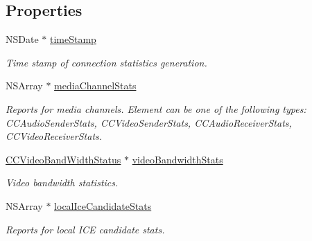 \subsection*{Properties}
\begin{DoxyCompactItemize}
\item 
\mbox{\label{interface_c_c_connection_status_a153b11c8fbc987bd7570385c652e05e7}} 
N\+S\+Date $\ast$ \hyperlink{interface_c_c_connection_status_a153b11c8fbc987bd7570385c652e05e7}{time\+Stamp}
\begin{DoxyCompactList}\small\item\em Time stamp of connection statistics generation. \end{DoxyCompactList}\item 
\mbox{\label{interface_c_c_connection_status_ab58630d72ae1c93f02bf2467a993ef2b}} 
N\+S\+Array $\ast$ \hyperlink{interface_c_c_connection_status_ab58630d72ae1c93f02bf2467a993ef2b}{media\+Channel\+Stats}
\begin{DoxyCompactList}\small\item\em Reports for media channels. Element can be one of the following types\+: C\+C\+Audio\+Sender\+Stats, C\+C\+Video\+Sender\+Stats, C\+C\+Audio\+Receiver\+Stats, C\+C\+Video\+Receiver\+Stats. \end{DoxyCompactList}\item 
\mbox{\label{interface_c_c_connection_status_a2ec3945f91253d49cc5c59561f70ec72}} 
\hyperlink{interface_c_c_video_band_width_status}{C\+C\+Video\+Band\+Width\+Status} $\ast$ \hyperlink{interface_c_c_connection_status_a2ec3945f91253d49cc5c59561f70ec72}{video\+Bandwidth\+Stats}
\begin{DoxyCompactList}\small\item\em Video bandwidth statistics. \end{DoxyCompactList}\item 
\mbox{\label{interface_c_c_connection_status_ac106106aa708ab80cc309985799e0ea8}} 
N\+S\+Array $\ast$ \hyperlink{interface_c_c_connection_status_ac106106aa708ab80cc309985799e0ea8}{local\+Ice\+Candidate\+Stats}
\begin{DoxyCompactList}\small\item\em Reports for local I\+CE candidate stats. \end{DoxyCompactList}\item 

\end{DoxyCompactItemize}
